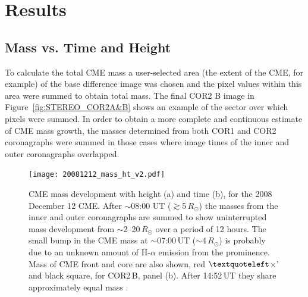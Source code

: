 

\section{Results}\label{sec:11}
\subsection{Mass vs. Time and Height}

To calculate the total CME mass a user-selected area (the extent of the CME, for example) of the base difference image was chosen and the pixel values within this area were summed to obtain total mass. The final COR2 B image in Figure~\ref{fig:STEREO_COR2A&B} shows an example of the sector over which pixels were summed. In order to obtain a more complete and continuous estimate of CME mass growth, the masses determined from both COR1 and COR2 coronagraphs were summed in those cases where image times of the inner and outer coronagraphs overlapped. 
\begin{figure}[!t]
\begin{center}
\texttt{[image: 20081212\_mass\_ht\_v2.pdf]}
\caption[CME mass as a function of height and time]{CME mass development with height (a) and time (b), for the 2008 December 12 CME. After $\sim$08:00 UT ($\gtrsim$5\,$R_{\odot}$) the masses from the inner and outer coronagraphs are summed to show uninterrupted mass development from $\sim$2--20\,$R_{\odot}$ over a period of 12 hours. The small bump in the CME mass at $\sim$07:00\,UT ($\sim$4\,$R_{\odot}$) is probably due to an unknown amount of H-$\alpha$ emission from the prominence. Mass of CME front and core are also shown, red $\textquoteleft$$\times$' and black square, for COR2\,B, panel (b). After 14:52\,UT they share approximately equal mass \citep{carley2012}.} %
\label{fig:20081212_mass_ht}
\end{center}
\end{figure}

